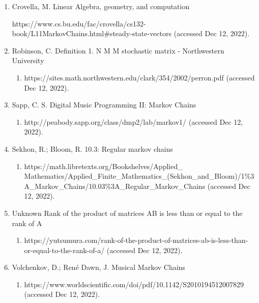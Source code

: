 \documentclass{article}
\begin{document}
\begin{enumerate}
    \item Crovella, M. Linear Algebra, geometry, and computation 

    \begin{enumerate}[label=]
    https://www.cs.bu.edu/fac/crovella/cs132-book/L11MarkovChains.html\#steady-state-vectors (accessed Dec 12,  2022). 
    \end{enumerate}
    
    \item Robinson, C. Deﬁnition 1. N M M stochastic matrix - Northwestern University 

    \begin{enumerate}[label=]               
    \item https://sites.math.northwestern.edu/clark/354/2002/perron.pdf (accessed Dec 12,  2022). 
    \end{enumerate} 
    
    \item Sapp, C. S. Digital Music Programming II: Markov Chains 

    \begin{enumerate}[label=] 
    \item http://peabody.sapp.org/class/dmp2/lab/markov1/ (accessed Dec 12,  2022). 
    \end{enumerate} 
    
    \item Sekhon, R.; Bloom, R. 10.3: Regular markov chains 

    \begin{enumerate}[label=]     
    \item https://math.libretexts.org/Bookshelves/Applied\_ Mathematics/Applied\_Finite\_Mathematics\_\newline(Sekhon\_and\_Bloom)/1\%3A\_Markov\_Chains/10.03\%3A\_Regular\_Markov\_Chains (accessed Dec 12,  2022).  
    \end{enumerate} 

    \item Unknown Rank of the product of matrices AB is less than or equal to the rank of A 

    \begin{enumerate}[label=] 
    \item https://yutsumura.com/rank-of-the-product-of-matrices-ab-is-less-than-or-equal-to-the-rank-of-a/ (accessed Dec 12,  2022). 
    \end{enumerate}
    
    \item Volchenkov, D.; René Dawn, J. Musical Markov Chains

    \begin{enumerate}[label=]  
    \item https://www.worldscientific.com/doi/pdf/10.1142/S2010194512007829 (accessed Dec 12,  2022). 
    \end{enumerate}
    
\end{enumerate}
\end{document}
